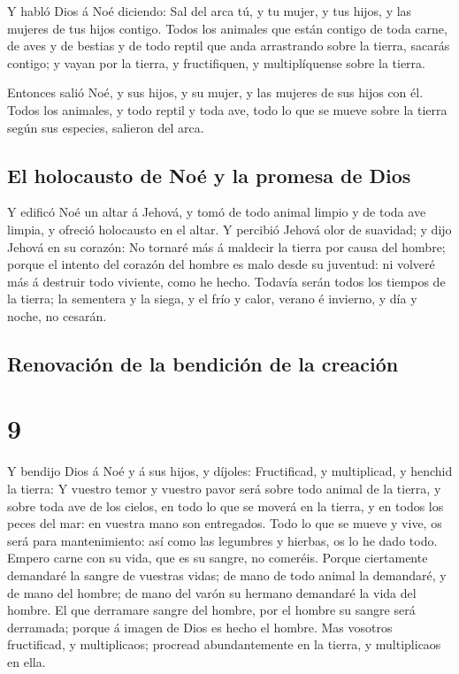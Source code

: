  Y habló Dios á Noé diciendo:  Sal del arca
tú, y tu mujer, y tus hijos, y las mujeres de tus hijos contigo.
 Todos los animales que están contigo de toda carne, de
aves y de bestias y de todo reptil que anda arrastrando sobre la tierra,
sacarás contigo; y vayan por la tierra, y fructifiquen, y multiplíquense
sobre la tierra.

 Entonces salió Noé, y sus hijos, y su mujer, y las mujeres
de sus hijos con él.  Todos los animales, y todo reptil y
toda ave, todo lo que se mueve sobre la tierra según sus especies,
salieron del arca.

\hypertarget{el-holocausto-de-nouxe9-y-la-promesa-de-dios}{%
\subsection{El holocausto de Noé y la promesa de
Dios}\label{el-holocausto-de-nouxe9-y-la-promesa-de-dios}}

 Y edificó Noé un altar á Jehová, y tomó de todo animal
limpio y de toda ave limpia, y ofreció holocausto en el altar.
 Y percibió Jehová olor de suavidad; y dijo Jehová en su
corazón: No tornaré más á maldecir la tierra por causa del hombre;
porque el intento del corazón del hombre es malo desde su juventud: ni
volveré más á destruir todo viviente, como he hecho. 
Todavía serán todos los tiempos de la tierra; la sementera y la siega, y
el frío y calor, verano é invierno, y día y noche, no cesarán.

\hypertarget{renovaciuxf3n-de-la-bendiciuxf3n-de-la-creaciuxf3n}{%
\subsection{Renovación de la bendición de la
creación}\label{renovaciuxf3n-de-la-bendiciuxf3n-de-la-creaciuxf3n}}

\hypertarget{section-8}{%
\section{9}\label{section-8}}

 Y bendijo Dios á Noé y á sus hijos, y díjoles: Fructificad,
y multiplicad, y henchid la tierra:  Y vuestro temor y
vuestro pavor será sobre todo animal de la tierra, y sobre toda ave de
los cielos, en todo lo que se moverá en la tierra, y en todos los peces
del mar: en vuestra mano son entregados.  Todo lo que se
mueve y vive, os será para mantenimiento: así como las legumbres y
hierbas, os lo he dado todo.  Empero carne con su vida, que
es su sangre, no comeréis.  Porque ciertamente demandaré la
sangre de vuestras vidas; de mano de todo animal la demandaré, y de mano
del hombre; de mano del varón su hermano demandaré la vida del hombre.
 El que derramare sangre del hombre, por el hombre su sangre
será derramada; porque á imagen de Dios es hecho el hombre. 
Mas vosotros fructificad, y multiplicaos; procread abundantemente en la
tierra, y multiplicaos en ella.

